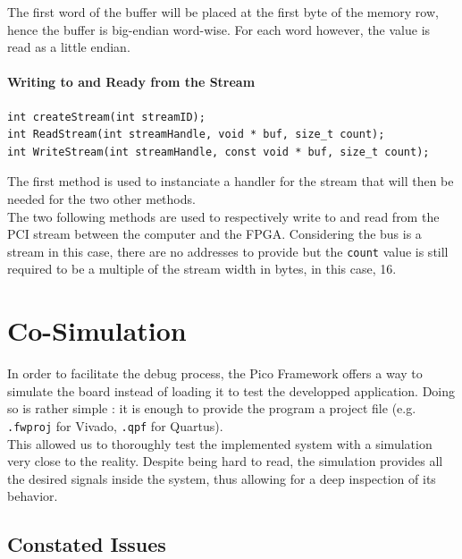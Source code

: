 The first word of the buffer will be placed at the first byte of the memory row, hence the buffer is big-endian word-wise. For each word however, the value is read as a little endian.

\paragraph{Writing to and Ready from the Stream}
\begin{verbatim}
int createStream(int streamID);
int ReadStream(int streamHandle, void * buf, size_t count);
int WriteStream(int streamHandle, const void * buf, size_t count);
\end{verbatim}
The first method is used to instanciate a handler for the stream that will then be needed for the two other methods. \\

The two following methods are used to respectively write to and read from the PCI stream between the computer and the FPGA. Considering the bus is a stream in this case, there are no addresses to provide but the \texttt{count} value is still required to be a multiple of the stream width in bytes, in this case, 16.

\section{Co-Simulation}

In order to facilitate the debug process, the Pico Framework offers a way to simulate the board instead of loading it to test the developped application. Doing so is rather simple : it is enough to provide the program a project file (e.g. \texttt{.fwproj} for Vivado, \texttt{.qpf} for Quartus).\\

This allowed us to thoroughly test the implemented system with a simulation very close to the reality. Despite being hard to read, the simulation provides all the desired signals inside the system, thus allowing for a deep inspection of its behavior.

\subsection{Constated Issues}

